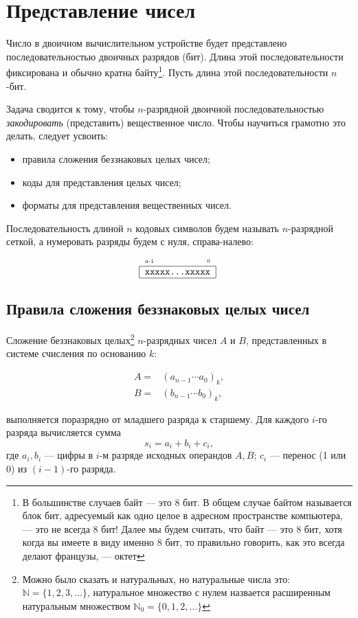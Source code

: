 \chapter{Представление чисел}
\label{ch:digitFormat}

Число в двоичном вычислительном устройстве будет представлено последовательностью двоичных разрядов (бит). Длина этой последовательности фиксирована и обычно кратна байту\footnote{В большинстве случаев байт --- это 8 бит. В общем случае байтом называется блок бит, адресуемый как одно целое в адресном пространстве компьютера, --- это не всегда 8 бит! Далее мы будем считать, что байт --- это 8 бит, хотя когда вы имеете в виду именно 8 бит, то правильно говорить, как это всегда делают французы, --- октет}. Пусть длина этой последовательности $n$-бит.

Задача сводится к тому, чтобы $n$-разрядной двоичной последовательностью \emph{закодировать} (представить) вещественное число. Чтобы научиться грамотно это делать, следует усвоить:

\begin{itemize}
    \item правила сложения беззнаковых целых чисел;
    \item коды для представления целых чисел;
    \item форматы для представления вещественных чисел.
\end{itemize}

Последовательность длиной $n$ кодовых символов будем называть $n$-разрядной сеткой, а нумеровать разряды будем с нуля, справа-налево:
\[
    \UnsignedAny{n-1}{xxxxx...xxxxx}
\]


\section{Правила сложения беззнаковых целых чисел}

Сложение беззнаковых целых\footnote{Можно было сказать и натуральных, но натуральные числа это: $\mathbb{N}=\{1,2,3,\ldots\}$, натуральное множество с нулем назвается расширенным натуральным множеством  $\mathbb{N}_0=\{0,1,2,\ldots\}$} $n$-разрядных чисел $A$ и $B$, представленных в системе счисления по основанию $k$:

\begin{align*}
    A=&(a_{n-1}\cdots a_0)_k,\\
    B=&(b_{n-1}\cdots b_0)_k,
\end{align*}

выполняется поразрядно от младшего разряда к старшему. Для каждого $i$-го разряда вычисляется сумма
\begin{equation}    
    \label{eq:digitFormat:sum}
    s_i = a_i + b_i + c_i,
\end{equation}
где $a_i,b_i$ --- цифры в $i$-м разряде исходных операндов $A,B$; $c_i$ --- перенос (1 или 0) из $(i-1)$-го разряда.

